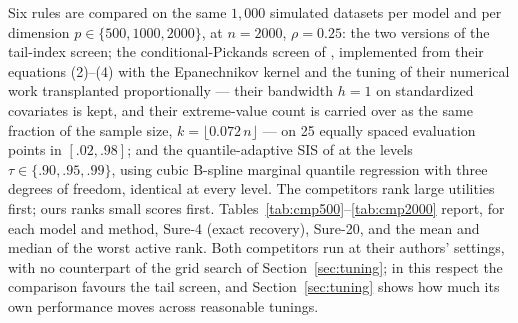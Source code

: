 \documentclass[bj,authoryear]{imsart}
\theoremstyle{plain}
\begin{document}
Six rules are compared on the same $1{,}000$ simulated datasets per
model and per dimension $p\in\{500,1000,2000\}$, at $n=2000$,
$\rho=0.25$: the two versions of the tail-index screen; the
conditional-Pickands screen of \citet{yoshidaUmezu2026}, implemented
from their equations (2)--(4) with the Epanechnikov kernel and the
tuning of their numerical work transplanted proportionally --- their
bandwidth $h=1$ on standardized covariates is kept, and their
extreme-value count is carried over as the same fraction of the sample
size, $k=\lfloor0.072\,n\rfloor$ --- on 25 equally spaced evaluation
points in $[.02,.98]$; and the quantile-adaptive SIS of \citet{heWangHong2013} at
the levels $\tau\in\{.90,.95,.99\}$, using cubic B-spline marginal
quantile regression with three degrees of freedom, identical at every
level. The competitors rank large utilities first; ours ranks small
scores first. Tables~\ref{tab:cmp500}--\ref{tab:cmp2000} report, for
each model and method, Sure-4 (exact recovery), Sure-20, and the mean
and median of the worst active rank. Both competitors run at their
authors' settings, with no counterpart of the grid search of
Section~\ref{sec:tuning}; in this respect the comparison favours the
tail screen, and Section~\ref{sec:tuning} shows how much its own
performance moves across reasonable tunings.
\end{document}

